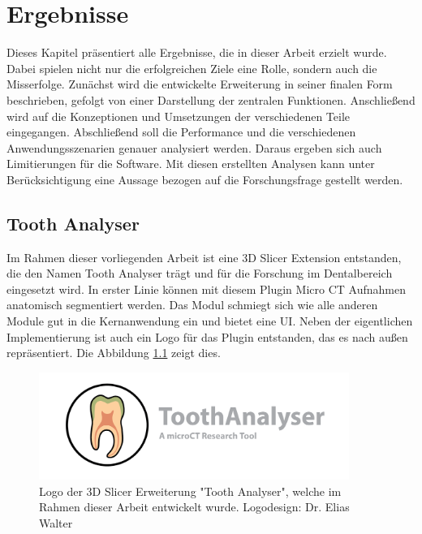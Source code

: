 \chapter{Ergebnisse}
\label{chap:ergebnisse} Dieses Kapitel präsentiert alle Ergebnisse, die in
dieser Arbeit erzielt wurde. Dabei spielen nicht nur die erfolgreichen Ziele eine
Rolle, sondern auch die Misserfolge. Zunächst wird die entwickelte Erweiterung in
seiner finalen Form beschrieben, gefolgt von einer Darstellung der zentralen
Funktionen. Anschließend wird auf die Konzeptionen und Umsetzungen der verschiedenen
Teile eingegangen. Abschließend soll die Performance und die verschiedenen
Anwendungsszenarien genauer analysiert werden. Daraus ergeben sich auch Limitierungen
für die Software. Mit diesen erstellten Analysen kann unter Berücksichtigung
eine Aussage bezogen auf die Forschungsfrage gestellt werden.

\section{Tooth Analyser}
Im Rahmen dieser vorliegenden Arbeit ist eine 3D Slicer Extension entstanden, die
den Namen Tooth Analyser trägt und für die Forschung im Dentalbereich eingesetzt
wird. In erster Linie können mit diesem Plugin Micro CT Aufnahmen anatomisch
segmentiert werden. Das Modul schmiegt sich wie alle anderen Module gut in die Kernanwendung
ein und bietet eine \ac{UI}. Neben der eigentlichen Implementierung ist auch ein
Logo für das Plugin entstanden, das es nach außen repräsentiert. Die Abbildung \ref{fig:logo_tooth_analyser}
zeigt dies.

\begin{figure}[h]
	\centering
	\includegraphics[width=0.9\textwidth]{img/SlicerToothAnalyser.png}
	\caption{Logo der 3D Slicer Erweiterung "Tooth Analyser", welche im Rahmen dieser
	Arbeit entwickelt wurde. Logodesign: Dr. Elias Walter}
	\label{fig:logo_tooth_analyser}
\end{figure}

